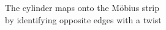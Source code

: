 \documentclass[preview]{standalone}
\begin{document}
\begin{center}
The cylinder maps onto the Möbius strip\\by identifying opposite edges with a twist
\end{center}
\end{document}
